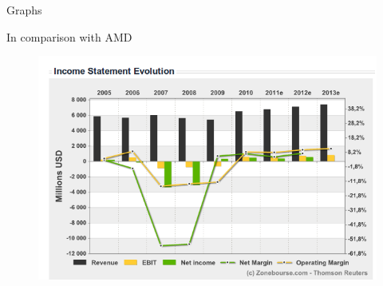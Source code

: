 \documentclass{beamer}
\begin{document}
\begin{frame}{Graphs}
	\begin{block}{In comparison with AMD}
		\begin{figure}[h]
			\includegraphics[width=0.90\textheight]{./Income_Statement_Evolution_amd.png}
		\end{figure}
	\end{block}	
\end{frame}
\end{document}
